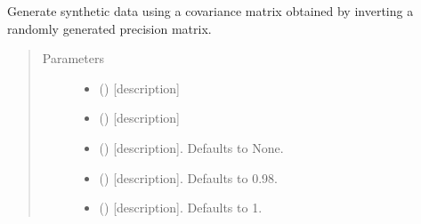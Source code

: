 \documentclass[letterpaper,10pt,english]{sphinxmanual}
\begin{document}
\begin{fulllineitems}
\label{\detokenize{_modules/cosifer.utils:cosifer.utils.data.get_synthetic_data}}
Generate synthetic data using a covariance matrix obtained by inverting
a randomly generated precision matrix.
\begin{quote}\begin{description}
\item[{Parameters}] \leavevmode\begin{itemize}
\item {} 
 (\sphinxstyleliteralemphasis{\sphinxupquote{{[}}}\sphinxstyleliteralemphasis{\sphinxupquote{{]}}}) \textendash{} {[}description{]}

\item {} 
 (\sphinxstyleliteralemphasis{\sphinxupquote{{[}}}\sphinxstyleliteralemphasis{\sphinxupquote{{]}}}) \textendash{} {[}description{]}

\item {} 
 (\sphinxstyleliteralemphasis{\sphinxupquote{{[}}}\sphinxstyleliteralemphasis{\sphinxupquote{{]}}}\sphinxstyleliteralemphasis{\sphinxupquote{, }}) \textendash{} {[}description{]}. Defaults to None.

\item {} 
 (\sphinxstyleliteralemphasis{\sphinxupquote{, }}) \textendash{} {[}description{]}. Defaults to 0.98.

\item {} 
 (\sphinxstyleliteralemphasis{\sphinxupquote{, }}) \textendash{} {[}description{]}. Defaults to 1.

\end{itemize}


\end{description}
\end{quote}
\end{fulllineitems}
\end{document}
